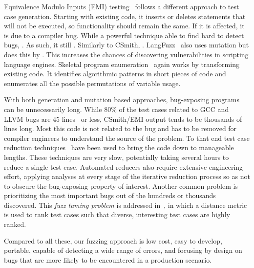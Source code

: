Equivalence Modulo Inputs (EMI) testing~\cite{Le2013a,Sun2016a} follows a different approach to test case generation. Starting with existing code, it inserts or deletes statements that will not be executed, so functionality should remain the same. If it is affected, it is due to a compiler bug. While a powerful technique able to find hard to detect bugs, . As such, it still . Similarly to CSmith, . LangFuzz~\cite{Holler2012} also uses mutation but does this by . This increases the chances of discovering vulnerabilities in scripting language engines. Skeletal program enumeration~\cite{Zhang2017a} again works by transforming existing code. It identifies algorithmic patterns in short pieces of code and enumerates all the possible permutations of variable usage.

With both generation and mutation based approaches, bug-exposing programs can be unnecessarily long. While 80\% of the test cases related to GCC and LLVM bugs are 45 lines~\cite{Sun2016} or less, CSmith/EMI output tends to be thousands of lines long. Most this code is not related to the bug and has to be removed for compiler engineers to understand the source of the problem. To that end test case reduction techniques~\cite{Regehr2012a,Pflanzer2016} have been used to bring the code down to manageable lengths. These techniques are very slow, potentially taking several hours to reduce a single test case. Automated reducers also require extensive engineering effort, applying analyses at every stage of the iterative reduction process so as not to obscure the bug-exposing property of interest. Another common problem is prioritizing the most important bugs out of the hundreds or thousands discovered. This \emph{fuzz taming problem} is addressed in~\cite{Chen2013}, in which a distance metric is used to rank test cases such that diverse, interesting test cases are highly ranked.

Compared to all these, our fuzzing approach is low cost, easy to develop, portable, capable of detecting a wide range of errors, and focusing by design on bugs that are more likely to be encountered in a production scenario.



